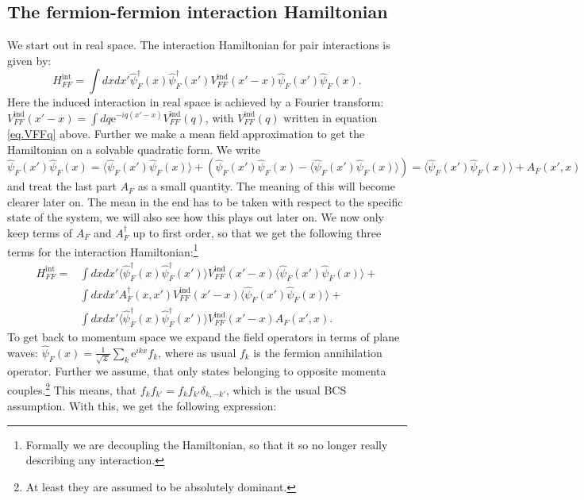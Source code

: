 \subsection{The fermion-fermion interaction Hamiltonian} \label{subsec.HFFint}

We start out in real space. The interaction Hamiltonian for pair interactions is given by:
\begin{equation}
H^\text{int}_{FF} = \int dxdx' \hat{\psi}^\dagger_F(x)\hat{\psi}^\dagger_F(x')V^\text{ind}_{FF}(x'-x) \hat{\psi}_F(x') \hat{\psi}_F(x).
\label{eq.HFFintdef}
\end{equation}
Here the induced interaction in real space is achieved by a Fourier transform: $V^\text{ind}_{FF}(x'-x) = \int dq \text{e}^{-iq(x'-x)} V^\text{ind}_{FF}(q)$, with $V^\text{ind}_{FF}(q)$ written in equation \eqref{eq.VFFq} above. Further we make a mean field approximation to get the Hamiltonian on a solvable quadratic form. We write
\begin{equation}
\hat{\psi}_F(x') \hat{\psi}_F(x) = \langle \hat{\psi}_F(x') \hat{\psi}_F(x) \rangle + \left(\hat{\psi}_F(x') \hat{\psi}_F(x)-\langle \hat{\psi}_F(x') \hat{\psi}_F(x) \rangle \right) = \langle \hat{\psi}_F(x') \hat{\psi}_F(x) \rangle + A_F(x',x)
\end{equation}
and treat the last part $A_F$ as a small quantity. The meaning of this will become clearer later on. The mean in the end has to be taken with respect to the specific state of the system, we will also see how this plays out later on. We now only keep terms of $A_F$ and $A^\dagger_F$ up to first order, so that we get the following three terms for the interaction Hamiltonian:\footnote{Formally we are decoupling the Hamiltonian, so that it so no longer really describing any interaction.}
\begin{align}
H^\text{int}_{FF} = &\int dxdx' \langle \hat{\psi}^\dagger_F(x) \hat{\psi}^\dagger_F(x') \rangle V^\text{ind}_{FF}(x'-x) \langle \hat{\psi}_F(x') \hat{\psi}_F(x) \rangle + \nonumber \\
&\int dxdx' A^\dagger_F(x,x') V^\text{ind}_{FF}(x'-x) \langle \hat{\psi}_F(x') \hat{\psi}_F(x) \rangle + \nonumber \\
&\int dxdx' \langle \hat{\psi}^\dagger_F(x) \hat{\psi}^\dagger_F(x') \rangle V^\text{ind}_{FF}(x'-x) A_F(x',x). \nonumber
\end{align} 
To get back to momentum space we expand the field operators in terms of plane waves: $\hat{\psi}_F(x) = \frac{1}{\sqrt{\mathcal{L}}}\sum_k \text{e}^{ikx} f_k$, where as usual $f_k$ is the fermion annihilation operator. Further we assume, that only states belonging to opposite momenta couples.\footnote{At least they are assumed to be absolutely dominant.} This means, that $f_kf_{k'} = f_kf_{k'}\delta_{k,-k'}$, which is the usual BCS assumption. With this, we get the following expression:
